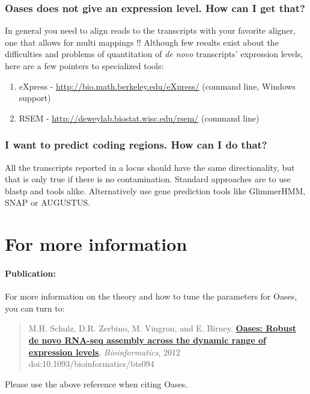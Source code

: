 \documentclass[12pt]{article}
\begin{document}
\subsubsection*{Oases does not give an expression level. How can I get that?}
In general you need to align reads to the transcripts with your favorite aligner, one that allows for multi mappings !! Although few results exist about the difficulties and problems of quantitation of \emph{de novo} transcripts' expression levels, here are a few pointers to specialized tools:
\begin{enumerate}
\item  eXpress - \url{http://bio.math.berkeley.edu/eXpress/} (command line, Windows support)
\item RSEM - \url{http://deweylab.biostat.wisc.edu/rsem/} (command line)

\end{enumerate}

\subsubsection*{I want to predict coding regions. How can I do that?}
All the transcripts reported in a locus should have the same directionality, but that is only true if there is no contamination. Standard approaches are to use blastp and tools alike.
Alternatively use gene prediction tools like GlimmerHMM, SNAP or AUGUSTUS.

\section{For more information}

\paragraph{Publication:}
 
 \label{sec:paper}
 
For more information on the theory and how to tune the parameters for Oases, you can turn to:
\begin{quote}
M.H. Schulz, D.R. Zerbino, M. Vingron, and E. Birney. 
\href{http://bioinformatics.oxfordjournals.org/content/early/2012/02/24/bioinformatics.bts094.abstract}{\textbf{Oases: Robust de novo RNA-seq assembly across the dynamic range of expression levels}}, \emph{Bioinformatics}, 2012\\
doi:10.1093/bioinformatics/bts094
\end{quote}
Please use the above reference when citing Oases.
\end{document}

